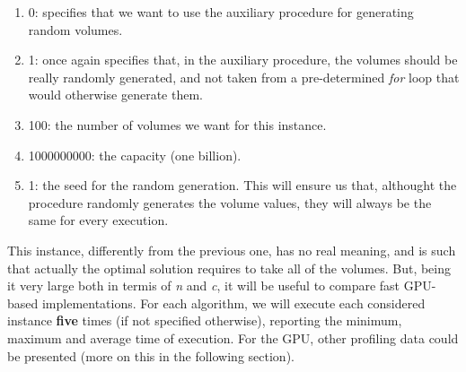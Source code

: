 \documentclass[12pt]{extarticle}
\begin{document}
\begin{enumerate}
    \item 0: specifies that we want to use the auxiliary procedure for generating random volumes.
    \item 1: once again specifies that, in the auxiliary procedure, the volumes should be really randomly generated, and not taken from a pre-determined \emph{for} loop that would otherwise generate them.
    \item 100: the number of volumes we want for this instance.
    \item 1000000000: the capacity (one billion).
    \item 1: the seed for the random generation. This will ensure us that, althought the procedure randomly generates the volume values, they will always be the same for every execution.
\end{enumerate}
This instance, differently from the previous one, has no real meaning, and is such that actually the optimal solution requires to take all of the volumes. But, being it very large both in termis of \emph{n} and \emph{c}, it will be useful to compare fast GPU-based implementations.\newline
\newline
For each algorithm, we will execute each considered instance \textbf{five} times (if not specified otherwise), reporting the minimum, maximum and average time of execution. For the GPU, other profiling data could be presented (more on this in the following section).
\end{document}
